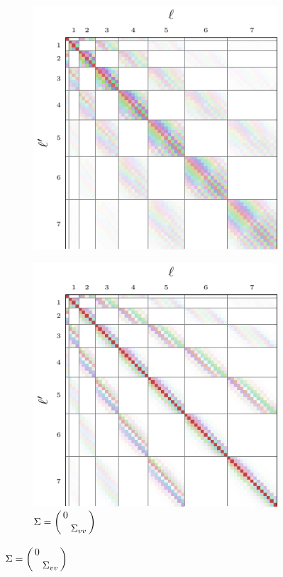 \documentclass[../../main.tex]{subfiles}
\begin{document}
\begin{refsection}
\begin{figure}
\begin{subfigure}[b]{0.31\textwidth}
			\includegraphics[width=\textwidth]{ftrans_se3_indep.pdf}
		\end{subfigure}
		\hfill
		\begin{subfigure}[b]{0.31\textwidth}
			\centering
			\caption{$\Sigma = \smqty(\dmat{0, \Sigma_{vv}})$}
			\includegraphics[width=\textwidth]{ftrans_se3_trans.pdf}
		\end{subfigure}


\end{figure}
\end{refsection}
\end{document}
